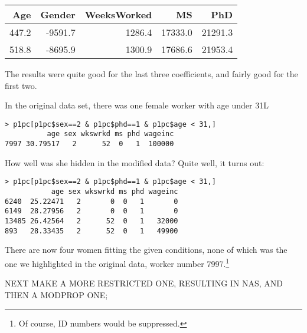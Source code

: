 \documentclass[11pt]{article}
\begin{document}
\begin{table}
\begin{center}
\vskip 0.5in
\begin{tabular}{|r|r|r|r|r|}
\hline
Age & Gender & WeeksWorked & MS & PhD \\ \hline 
447.2 & -9591.7 & 1286.4 & 17333.0 & 21291.3 \\ \hline 
518.8 & -8695.9 & 1300.9 & 17686.6 & 21953.4 \\ \hline 
\end{tabular}
\end{center}
\caption{}
\label{}
\end{table}

The results were quite good for the last three coefficients, and fairly
good for the first two.

In the original data set, there was one female worker with age under 31L

\begin{lstlisting}
> p1pc[p1pc$sex==2 & p1pc$phd==1 & p1pc$age < 31,]
          age sex wkswrkd ms phd wageinc
7997 30.79517   2      52  0   1  100000
\end{lstlisting}

How well was she hidden in the modified data?  Quite well, it turns out:

\begin{lstlisting}
> p1pc[p1pc$sex==2 & p1pc$phd==1 & p1pc$age < 31,]
           age sex wkswrkd ms phd wageinc
6240  25.22471   2       0  0   1       0
6149  28.27956   2       0  0   1       0
13485 26.42564   2      52  0   1   32000
893   28.33435   2      52  0   1   49900
\end{lstlisting}

There are now four women fitting the given conditions, none of which was
the one we highlighted in the original data, worker number
7997.\footnote{Of course, ID numbers would be suppressed.}

NEXT MAKE A MORE RESTRICTED ONE, RESULTING IN NAS, AND THEN A MODPROP
ONE; 



\end{document}
